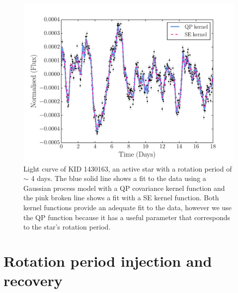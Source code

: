 
\begin{figure}
\begin{center}
\includegraphics[width=6in, clip=true]{figures/001430163.pdf}
\caption[A light curve with a GP model.]
{Light curve of KID 1430163, an active star with a rotation period of $\sim$ 4
days.
The blue solid line shows a fit to the data using
a Gaussian process model with a QP covariance kernel function and the pink
broken line shows a fit with a SE kernel function.
Both kernel functions provide an adequate fit to the data, however we use the
QP function because it has a useful parameter that corresponds to the star's
rotation period.}
\label{fig:GP_example}
\end{center}
\end{figure}

\section{Rotation period injection and recovery}

